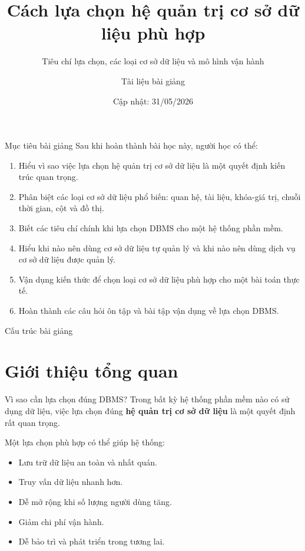 \documentclass[aspectratio=169,11pt]{beamer}
\title[Cách lựa chọn DBMS]{Cách lựa chọn hệ quản trị cơ sở dữ liệu phù hợp}
\subtitle{Tiêu chí lựa chọn, các loại cơ sở dữ liệu và mô hình vận hành}
\author{Tài liệu bài giảng}
\institute{Môn học: Cơ sở dữ liệu}
\date{Cập nhật: 31/05/2026}
\newcommand{\keyword}[1]{\textcolor{accent}{\textbf{#1}}}
\newcommand{\kw}[1]{\keyword{#1}}
\newcommand{\smallitem}{\setlength{\itemsep}{2pt}\setlength{\parskip}{0pt}}
\begin{document}
\begin{frame}
  \titlepage
\end{frame}


\begin{frame}{Mục tiêu bài giảng}
Sau khi hoàn thành bài học này, người học có thể:
\begin{enumerate}
  \smallitem
  \item Hiểu vì sao việc lựa chọn hệ quản trị cơ sở dữ liệu là một quyết định kiến trúc quan trọng.
  \item Phân biệt các loại cơ sở dữ liệu phổ biến: quan hệ, tài liệu, khóa-giá trị, chuỗi thời gian, cột và đồ thị.
  \item Biết các tiêu chí chính khi lựa chọn DBMS cho một hệ thống phần mềm.
  \item Hiểu khi nào nên dùng cơ sở dữ liệu tự quản lý và khi nào nên dùng dịch vụ cơ sở dữ liệu được quản lý.
  \item Vận dụng kiến thức để chọn loại cơ sở dữ liệu phù hợp cho một bài toán thực tế.
  \item Hoàn thành các câu hỏi ôn tập và bài tập vận dụng về lựa chọn DBMS.
\end{enumerate}
\end{frame}

\begin{frame}[allowframebreaks]{Cấu trúc bài giảng}
\small
\tableofcontents
\end{frame}

\section{Giới thiệu tổng quan}

\begin{frame}{Vì sao cần lựa chọn đúng DBMS?}
Trong bất kỳ hệ thống phần mềm nào có sử dụng dữ liệu, việc lựa chọn đúng \kw{hệ quản trị cơ sở dữ liệu} là một quyết định rất quan trọng.

\vspace{2mm}
Một lựa chọn phù hợp có thể giúp hệ thống:
\begin{itemize}
  \smallitem
  \item Lưu trữ dữ liệu an toàn và nhất quán.
  \item Truy vấn dữ liệu nhanh hơn.
  \item Dễ mở rộng khi số lượng người dùng tăng.
  \item Giảm chi phí vận hành.
  \item Dễ bảo trì và phát triển trong tương lai.
\end{itemize}
\end{frame}
\end{document}
